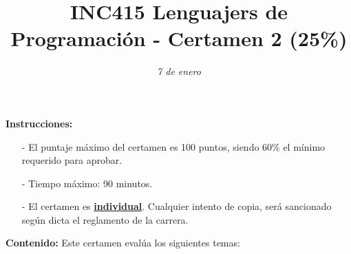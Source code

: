 \documentclass{exam}
\title{\LARGE\color{azul}\textbf{INC415 Lenguajers de Programaci\'on - Certamen 2 (25\%)}}
\author{\normalsize \color{gray}{Prof.} \color{black}{\textbf{Rodrigo Olivares}}}
\date{\normalsize \em 7 de enero}
\begin{document}

\maketitle

\vspace*{-7mm}
\noindent
\textbf{Instrucciones:} 
\begin{itemize}
    \item[-] El puntaje m\'aximo del certamen es 100 puntos, siendo 60\% el m\'inimo requerido para aprobar.
    \item[-] Tiempo m\'aximo: 90 minutos.
    \item[-] El certamen es \underline{\textbf{individual}}. Cualquier intento de copia, ser\'a sancionado seg\'un dicta el reglamento de la carrera.
\end{itemize}


\noindent
\textbf{Contenido:} Este certamen eval\'ua los siguientes temas:
\end{document}
